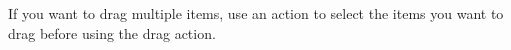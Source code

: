 If you want to drag multiple items, use an action to select the items you want to drag before using the drag action. 
